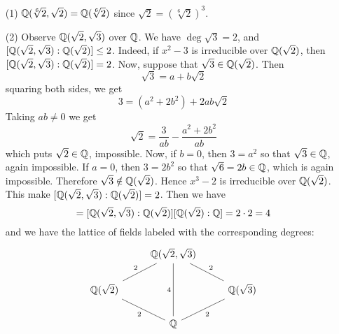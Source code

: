 \begin{example}\label{example_8.8}
  \begin{enumerate}
    \item[(1)] $\mathbb{Q}(\sqrt[6]{2}, \sqrt{2})=\mathbb{Q}(\sqrt[6]{2})$ since
      $\sqrt{2}=(\sqrt[6]{2})^3$.

    \item[(2)] Observe $\mathbb{Q}(\sqrt{2},\sqrt{3})$ over $\mathbb{Q}$. We have
      $\deg{\sqrt{3}}=2$, and $[\mathbb{Q}(\sqrt{2},\sqrt{3}):\mathbb{Q}(\sqrt{2})]
      \leq 2$. Indeed, if $x^2-3$ is irreducible over $\mathbb{Q}(\sqrt{2})$,
      then $[\mathbb{Q}(\sqrt{2},\sqrt{3}):\mathbb{Q}(\sqrt{2})]=2$. Now, suppose that
      $\sqrt{3} \in \mathbb{Q}(\sqrt{2})$. Then
      \begin{equation*}
        \sqrt{3}=a+b\sqrt{2}
      \end{equation*}
      squaring both sides, we get
      \begin{equation*}
        3=(a^2+2b^2)+2ab\sqrt{2}
      \end{equation*}
      Taking $ab \neq 0$ we get
      \begin{equation*}
        \sqrt{2}=\frac{3}{ab}-\frac{a^2+2b^2}{ab}
      \end{equation*}
      which puts $\sqrt{2} \in \mathbb{Q}$, impossible. Now, if $b=0$, then
      $3=a^2$ so that $\sqrt{3} \in \mathbb{Q}$, again impossible. If $a=0$,
      then  $3=2b^2$ so that $\sqrt{6}=2b \in \mathbb{Q}$, which is again
      impossible. Therefore $\sqrt{3} \notin \mathbb{Q}(\sqrt{2})$. Hence
      $x^3-2$ is irreducible over $\mathbb{Q}(\sqrt{2})$. This make
      $[\mathbb{Q}(\sqrt{2},\sqrt{3}):\mathbb{Q}(\sqrt{2})]=2$. Then we have
      \begin{equation*}
        [\Q(\sqrt{2},\sqrt{3}):\Q]=[\Q(\sqrt{2},\sqrt{3}):\Q(\sqrt{2})]
        [\Q(\sqrt{2}):\Q]=2 \cdot 2=4
      \end{equation*}
      and we have the lattice of fields labeled with the corresponding
      degrees:
      \[\begin{tikzcd}
  & {\Q(\sqrt{2},\sqrt{3})} \\
        {\Q(\sqrt{2})} && {\Q(\sqrt{3})} \\
                       & \Q
                       \arrow["2", no head, from=2-1, to=1-2]
                       \arrow["2"', no head, from=2-3, to=1-2]
                       \arrow["4", no head, from=3-2, to=1-2]
                       \arrow["2", no head, from=3-2, to=2-1]
                       \arrow["2"', no head, from=3-2, to=2-3]
      \end{tikzcd}\]
  \end{enumerate}
\end{example}

